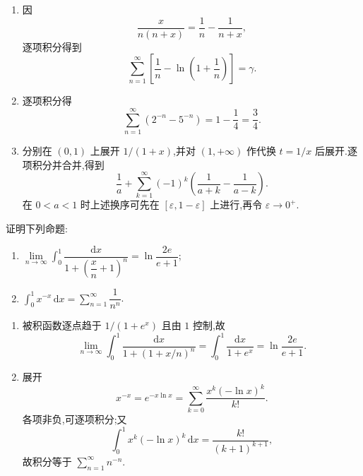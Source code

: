 \begin{solution}
    \begin{enumerate}
        \item 因
              \[
                  \dfrac{x}{n(n+x)}=\dfrac{1}{n}-\dfrac{1}{n+x},
              \]
              逐项积分得到
              \[
                  \sum\limits_{n=1}^{\infty}\left[\dfrac{1}{n}-\ln\left(1+\dfrac{1}{n}\right)\right]=\gamma.
              \]
        \item 逐项积分得
              \[
                  \sum\limits_{n=1}^{\infty}(2^{-n}-5^{-n})=1-\dfrac{1}{4}=\dfrac{3}{4}.
              \]
        \item 分别在 $(0,1)$ 上展开 $1/(1+x)$,并对 $(1,+\infty)$ 作代换 $t=1/x$ 后展开.逐项积分并合并,得到
              \[
                  \dfrac{1}{a}+\sum\limits_{k=1}^{\infty}(-1)^k
                  \left(\dfrac{1}{a+k}-\dfrac{1}{a-k}\right).
              \]
              在 $0<a<1$ 时上述换序可先在 $[\varepsilon,1-\varepsilon]$ 上进行,再令 $\varepsilon\to0^+$.
    \end{enumerate}
\end{solution}

\begin{example}
    证明下列命题:
    \begin{enumerate}
        \item $\displaystyle\lim\limits_{n\to\infty}\int_0^1\dfrac{\mathrm{d}x}{1+\left(\dfrac{x}{n}+1\right)^n}=\ln\dfrac{2e}{e+1}$;
        \item $\displaystyle\int_0^1x^{-x}\,\mathrm{d}x=\sum\limits_{n=1}^{\infty}\dfrac{1}{n^n}$.
    \end{enumerate}
\end{example}
\exampleblank

\begin{solution}
    \begin{enumerate}
        \item 被积函数逐点趋于 $1/(1+e^x)$ 且由 $1$ 控制,故
              \[
                  \lim\limits_{n\to\infty}\int_0^1\dfrac{\mathrm{d}x}{1+(1+x/n)^n}
                  =\int_0^1\dfrac{\mathrm{d}x}{1+e^x}
                  =\ln\dfrac{2e}{e+1}.
              \]
        \item 展开
              \[
                  x^{-x}=e^{-x\ln x}
                  =\sum\limits_{k=0}^{\infty}\dfrac{x^k(-\ln x)^k}{k!}.
              \]
              各项非负,可逐项积分;又
              \[
                  \int_0^1x^k(-\ln x)^k\,\mathrm{d}x=\dfrac{k!}{(k+1)^{k+1}},
              \]
              故积分等于 $\sum_{n=1}^{\infty}n^{-n}$.
    \end{enumerate}
\end{solution}

